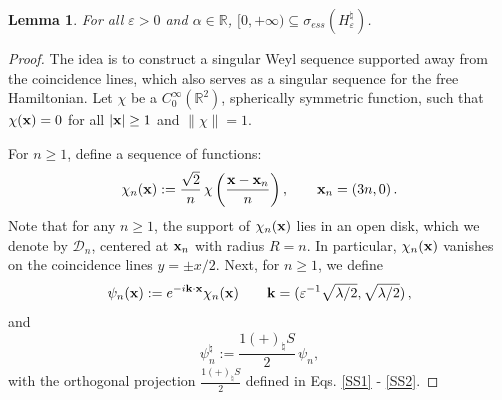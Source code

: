 \documentclass[a4paper,11pt,reqno]{amsart}
\newtheorem{lemma}[theorem]{Lemma}
\theoremstyle{definition}
\numberwithin{equation}{section}
\newcommand{\RE}{\mathbb R}
\newcommand{\ve}{\varepsilon}
\newcommand{\x}{{\bf  x}}
\renewcommand{\k}{{\bf k}}
\newcommand{\bosfer}{{\natural}}
\newcommand{\bosferpm}{{(+)}}
\begin{document}
\begin{lemma}\label{l:esssp}
 For all $\ve>0$ and  $\alpha\in\RE$,    $[0, +\infty) \subseteq \sigma_{ess}( H^\bosfer_\ve)$.
\end{lemma}
\begin{proof}
 The idea is to construct a singular Weyl  sequence supported away from the coincidence lines, which also serves as a singular sequence for the free Hamiltonian. Let $\chi$ be a 
    $C_{0}^\infty(\RE^2)$, spherically symmetric function, such that $\chi(\x) =0$ for all $|\x|\geq 1$ and $\|\chi\| = 1$. 

    For $n\ge 1$,  define a sequence of functions:
    \begin{equation*}
        \chi_{n}(\x) := \frac{\sqrt{2}}{n} \,\chi\left(\frac{\x-\x_{n}}{n}\right), \qquad \x_{n}  =(3n,0) \, .
    \end{equation*}
Note that for any $n \geq 1$, the support of $\chi_{n}(\x)$  lies in an  open disk, which we denote   by $\mathcal D_{n}$, centered at $\x_{n}$ with radius $R=n$. In particular, $\chi_{n}(\x)$ vanishes on the coincidence lines $y = \pm x/2$. Next, for $n \geq 1$, we  define 
\[
        \psi_{n}(\x) := e^{-i\k\cdot \x} \chi_n (\x) \qquad \k = (\ve^{-1}\sqrt{\lambda/2},\sqrt{\lambda/2}) \, ,
\]
and 
 \begin{equation*}
        \psi^{\bosfer}_{n} :=  \frac{1\bosferpm_\bosfer S}{2} \,      \psi_{n}  ,
    \end{equation*}
with the orthogonal projection $\frac{1\bosferpm_\bosfer S}{2}$ defined in Eqs. \eqref{SS1} - \eqref{SS2}. 


\end{proof}
\end{document}
